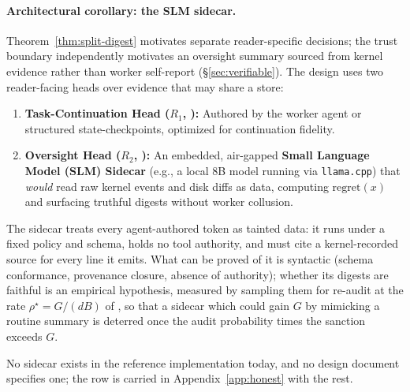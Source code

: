 \documentclass[11pt,a4paper]{article}
\theoremstyle{definition}
\theoremstyle{plain}
\begin{document}
\paragraph{Architectural corollary: the SLM sidecar.}
Theorem~\ref{thm:split-digest} motivates separate reader-specific decisions;
the trust boundary independently motivates an oversight summary sourced from
kernel evidence rather than worker self-report (\S\ref{sec:verifiable}).
The design uses two reader-facing heads over evidence that may share a store:
\begin{enumerate}[leftmargin=1.4em,itemsep=1pt]
\item \textbf{Task-Continuation Head ($R_1$, \Designed):} Authored by the worker agent or structured state-checkpoints, optimized for continuation fidelity.
\item \textbf{Oversight Head ($R_2$, \Vision):} An embedded, air-gapped \textbf{Small Language Model (SLM) Sidecar} (e.g., a local 8B model running via \texttt{llama.cpp}) that \emph{would} read raw kernel events and disk diffs as data, computing $\mathrm{regret}(x)$ and surfacing truthful digests without worker collusion.
\end{enumerate}
\noindent The sidecar treats every agent-authored token as tainted data: it runs
under a fixed policy and schema, holds no tool authority, and must cite a
kernel-recorded source for every line it emits. What can be proved of it is
syntactic (schema conformance, provenance closure, absence of authority); whether
its digests are faithful is an empirical hypothesis, measured by sampling them for
re-audit at the rate $\rho^\star=G/(dB)$ of ,
so that a sidecar which could gain $G$ by mimicking a routine summary is deterred
once the audit probability times the sanction exceeds $G$.

\noindent No sidecar exists in the reference implementation today, and no design
document specifies one; the row is carried in Appendix~\ref{app:honest} with the rest.
\end{document}
